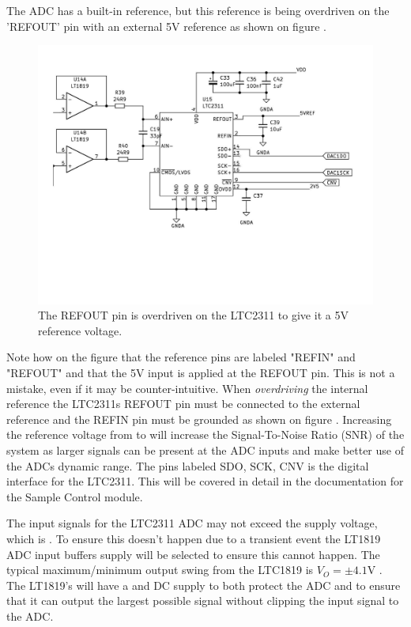 The ADC has a built-in  reference, but this reference is being overdriven on the 'REFOUT' pin with an external 5V reference as shown on figure .

\begin{figure}[H]
    \centering
    \includegraphics[clip, trim=0 150 0 0, width=1\textwidth]{Sections/7_SystemDesign/Figures/7_1_2_ADC5V.pdf}
    \caption{The REFOUT pin is overdriven on the LTC2311 to give it a 5V reference voltage.}
    \label{fig_7_1_2_ADC5VREF}
\end{figure}

Note how on the figure that the reference pins are labeled "REFIN" and "REFOUT" and that the 5V input is applied at the REFOUT pin. This is not a mistake, even if it may be counter-intuitive. When \textit{overdriving} the internal reference the LTC2311s REFOUT pin must be connected to the external reference and the REFIN pin must be grounded as shown on figure . Increasing the reference voltage from  to  will increase the Signal-To-Noise Ratio (SNR) of the system as larger signals can be present at the ADC inputs and make better use of the ADCs dynamic range. The pins labeled SDO, SCK, CNV is the digital interface for the LTC2311. This will be covered in detail in the documentation for the Sample Control module.

The input signals for the LTC2311 ADC may not exceed the supply voltage, which is . To ensure this doesn't happen due to a transient event the LT1819 ADC input buffers supply will be selected to ensure this cannot happen. The typical maximum/minimum output swing from the LTC1819 is $V_{O} = \pm 4.1$V \cite{OPAMP_LT1819}. The LT1819's will have a  and  DC supply to both protect the ADC and to ensure that it can output the largest possible signal without clipping the input signal to the ADC.  

